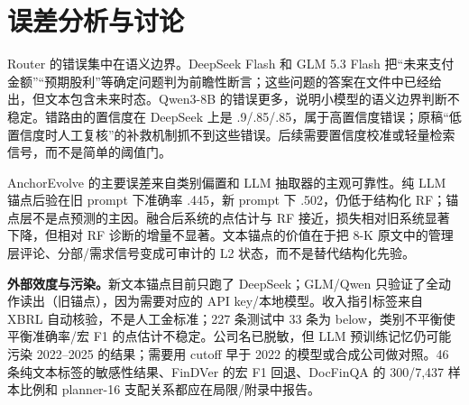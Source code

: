 \section{误差分析与讨论}

Router 的错误集中在语义边界。DeepSeek Flash 和 GLM 5.3 Flash 把“未来支付金额”“预期股利”等确定问题判为前瞻性断言；这些问题的答案在文件中已经给出，但文本包含未来时态。Qwen3-8B 的错误更多，说明小模型的语义边界判断不稳定。错路由的置信度在 DeepSeek 上是 .9/.85/.85，属于高置信度错误；原稿“低置信度时人工复核”的补救机制抓不到这些错误。后续需要置信度校准或轻量检索信号，而不是简单的阈值门。

AnchorEvolve 的主要误差来自类别偏置和 LLM 抽取器的主观可靠性。纯 LLM 锚点后验在旧 prompt 下准确率 .445，新 prompt 下 .502，仍低于结构化 RF；锚点层不是点预测的主因。融合后系统的点估计与 RF 接近，损失相对旧系统显著下降，但相对 RF 诊断的增量不显著。文本锚点的价值在于把 8-K 原文中的管理层评论、分部/需求信号变成可审计的 L2 状态，而不是替代结构化先验。

\begin{revbox}
\noindent\textbf{外部效度与污染。}新文本锚点目前只跑了 DeepSeek；GLM/Qwen 只验证了全动作读出（旧锚点），因为需要对应的 API key/本地模型。收入指引标签来自 XBRL 自动核验，不是人工金标准；227 条测试中 33 条为 below，类别不平衡使平衡准确率/宏 F1 的点估计不稳定。公司名已脱敏，但 LLM 预训练记忆仍可能污染 2022--2025 的结果；需要用 cutoff 早于 2022 的模型或合成公司做对照。46 条纯文本标签的敏感性结果、FinDVer 的宏 F1 回退、DocFinQA 的 300/7,437 样本比例和 planner-16 支配关系都应在局限/附录中报告。
\end{revbox}
